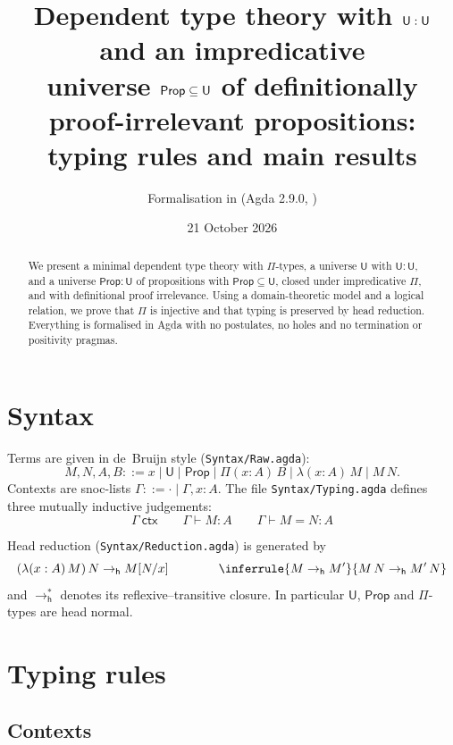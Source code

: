\documentclass[11pt]{article}
\title{Dependent type theory with $\U : \U$ and an impredicative\\
  universe $\Prop \subseteq \U$ of definitionally proof-irrelevant propositions:\\
  typing rules and main results}
\author{Formalisation in \agda{MINPROP/} (Agda 2.9.0, \agda{--without-K})}
\date{21 October 2026}
\newcommand{\U}{\mathsf{U}}
\newcommand{\Prop}{\mathsf{Prop}}
\newcommand{\Pit}[2]{\Pi(#1)\,#2}
\newcommand{\lam}[2]{\lambda(#1)\,#2}
\newcommand{\ctx}[1]{#1\ \mathsf{ctx}}
\newcommand{\ty}[3]{#1 \vdash #2 : #3}
\newcommand{\cv}[4]{#1 \vdash #2 = #3 : #4}
\newcommand{\hr}{\mathrel{\to^{*}_{\mathsf{h}}}}
\newcommand{\hrone}{\mathrel{\to_{\mathsf{h}}}}
\newcommand{\agda}[1]{\texttt{#1}}
\theoremstyle{plain}
\theoremstyle{remark}
\begin{document}
\maketitle

\begin{abstract}
We present a minimal dependent type theory with $\Pi$-types, a universe
$\U$ with $\U : \U$, and a universe $\Prop : \U$ of propositions with
$\Prop \subseteq \U$, closed under impredicative $\Pi$, and with
definitional proof irrelevance. Using a domain-theoretic model and a
logical relation, we prove that $\Pi$ is injective and that typing is
preserved by head reduction. Everything is formalised in Agda with no
postulates, no holes and no termination or positivity pragmas.
\end{abstract}

\section{Syntax}

Terms are given in de~Bruijn style (\agda{Syntax/Raw.agda}):
\[
  M, N, A, B ::= x \mid \U \mid \Prop \mid \Pit{x:A}{B} \mid \lam{x:A}{M} \mid M\,N .
\]
Contexts are snoc-lists $\Gamma ::= \cdot \mid \Gamma, x{:}A$. The file
\agda{Syntax/Typing.agda} defines three mutually inductive judgements:
\[
  \ctx{\Gamma} \qquad \ty{\Gamma}{M}{A} \qquad \cv{\Gamma}{M}{N}{A}
\]

Head reduction (\agda{Syntax/Reduction.agda}) is generated by
\[
  (\lam{x:A}{M})\,N \hrone M[N/x]
  \qquad\qquad
  \inferrule{M \hrone M'}{M\,N \hrone M'\,N}
\]
and $\hr$ denotes its reflexive--transitive closure. In particular $\U$,
$\Prop$ and $\Pi$-types are head normal.

\section{Typing rules}

\subsection*{Contexts}
\end{document}
